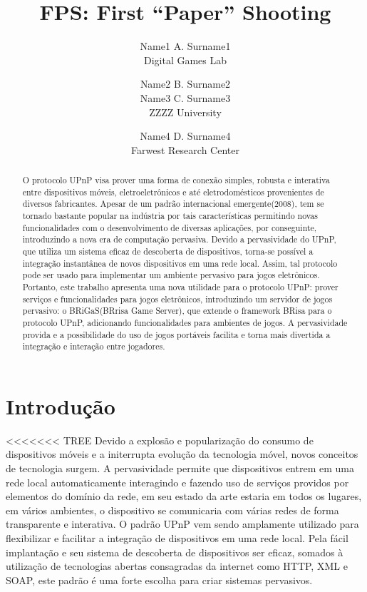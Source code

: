 \documentclass[a4paper]{sbgames}               %
\title{FPS: First ``Paper''  Shooting}
\author{Name1 A. Surname1\\ Digital Games Lab 
        \and Name2 B. Surname2\\ Name3 C. Surname3\\ ZZZZ University
        \and Name4 D. Surname4\\ Farwest Research Center 
}
\begin{document}


\maketitle


\begin{abstract}
  O protocolo UPnP visa prover uma forma de conexão simples, robusta e interativa entre dispositivos móveis, eletroeletrônicos e até eletrodomésticos provenientes de diversos fabricantes. Apesar de um padrão internacional emergente(2008), tem se tornado bastante popular na indústria por tais características permitindo novas funcionalidades com o desenvolvimento de diversas aplicações, por conseguinte, introduzindo a nova era de computação pervasiva. Devido a pervasividade do UPnP, que utiliza um sistema eficaz de descoberta de dispositivos, torna-se possível a integração instantânea de novos dispositivos em uma rede local. Assim, tal protocolo pode ser usado para implementar um ambiente pervasivo para jogos eletrônicos. Portanto, este trabalho apresenta uma nova utilidade para o protocolo UPnP: prover serviços e funcionalidades para jogos eletrônicos, introduzindo um servidor de jogos pervasivo: o BRiGaS(BRrisa Game Server), que extende o framework BRisa para o protocolo UPnP, adicionando funcionalidades para ambientes de jogos. A pervasividade provida e a possibilidade do uso de jogos portáveis facilita e torna mais divertida a integração e interação entre jogadores.
\end{abstract}

\keywordlist
\contactlist

\section{Introdução}

<<<<<<< TREE
Devido a explosão e popularização do consumo de dispositivos móveis e a initerrupta evolução da tecnologia móvel, novos conceitos de tecnologia surgem. A pervasividade permite que dispositivos entrem em uma rede local automaticamente interagindo e fazendo uso de serviços providos por elementos do domínio da rede, em seu estado da arte estaria em todos os lugares, em vários ambientes, o dispositivo se comunicaria com várias redes de forma transparente e interativa. O padrão UPnP vem sendo amplamente utilizado para flexibilizar e facilitar a integração de dispositivos em uma rede local. Pela fácil implantação e seu sistema de descoberta de dispositivos ser eficaz, somados à utilização de tecnologias abertas consagradas da internet como HTTP, XML e SOAP, este padrão é uma forte escolha para criar sistemas pervasivos. 
\end{document}

